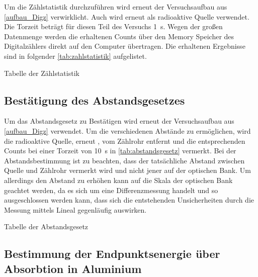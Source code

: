 \documentclass[12pt,english,ngerman]{scrartcl}
\begin{document}
Um die Zählstatistik durchzuführen wird erneut der Versuchsaufbau aus \autoref{aufbau_Digz} verwirklicht. Auch wird erneut
 als radioaktive Quelle verwendet.
Die Torzeit beträgt für diesen Teil des Versuchs \SI{1}{\second}. Wegen der großen Datenmenge werden die erhaltenen Counts über den
Memory Speicher des Digitalzählers direkt auf den Computer übertragen. Die erhaltenen Ergebnisse sind in folgender 
\autoref{tab:zahlstatistik} aufgelistet.


\begin{table}
  \caption{Tabelle der Zählstatistik}
  \label{tab:zahlstatistik}
  \begin{center}
    
  \end{center}
\end{table}


\subsection{Bestätigung des Abstandsgesetzes}

Um das Abstandsgesetz zu Bestätigen wird erneut der Versuchsaufbau aus \autoref{aufbau_Digz} verwendet. Um die verschiedenen 
Abstände zu ermöglichen, wird die radioaktive Quelle, erneut , vom Zählrohr entfernt und die entsprechenden Counts bei
einer Torzeit von \SI{10}{\second} in \autoref{tab:abstandsgesetz} vermerkt. Bei der Abstandsbestimmung ist zu beachten,
dass der tatsächliche Abstand zwischen Quelle und Zählrohr vermerkt wird und nicht jener auf der optischen Bank. Um allerdings
den Abstand zu erhöhen kann auf die Skala der optischen Bank geachtet werden, da es sich um eine Differenzmessung handelt 
und so ausgeschlossen werden kann, dass sich die entstehenden Unsicherheiten durch die Messung mittels Lineal gegenläufig auswirken.

\begin{table}
  \caption{Tabelle der Abstandsgesetz}
  \label{tab:abstandsgesetz}
  \begin{center}
    
  \end{center}
\end{table}


\subsection{Bestimmung der Endpunktsenergie über Absorbtion in Aluminium}
\end{document}

